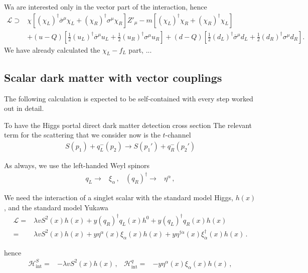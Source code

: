 Wa are interested only in the vector part of the interaction, hence
\begin{align}
   \mathcal{L}\supset& \chi \left[ \left( \chi_L \right)^{\dagger}  \overline{\sigma}^{\mu}\chi_L+\left( \chi_R \right)^{\dagger} {\sigma}^{\mu}  \chi_R \right]  Z'_{\mu}
           -m \left[\left( \chi_L \right)^{\dagger} \chi_R+
  \left( \chi_R \right)^{\dagger} \chi_L\right] \nonumber\\
  &+(u-Q)\left[ \frac{1}{2}\left( u_L \right)^{\dagger}\overline{\sigma}^{\mu} u_L+\frac{1}{2}\left( u_R \right)^{\dagger}{\sigma}^{\mu} u_R  \right]
  +(d-Q)\left[ \frac{1}{2}\left( d_L \right)^{\dagger}\overline{\sigma}^{\mu} d_L+\frac{1}{2}\left( d_R \right)^{\dagger}{\sigma}^{\mu} d_R  \right].
\end{align}
We have already calculated the $\chi_{L}-f_L$ part, ...
 
\subsection{Scalar dark matter with vector couplings}

The following calculation is expected to be self-contained with every step worked out in detail.

To have the Higgs portal direct dark matter detection cross section
The relevant term for the scattering that we consider now is the $t$-channel
\begin{align}
  S(p_1)+q_L^{-}(p_2)\to  S(p_1')+q_R^{-}(p_2')
\end{align}

As always, we use the left-handed Weyl spinors
\begin{align}
  q_L\to &\xi_{\alpha}\,, &   \left( q_R \right)^{\dagger}\to &\eta^{\alpha}\,,
\end{align}


We need the interaction of a singlet scalar with the standard model Higgs, $h(x)$, and the standard model Yukawa
\begin{align}
  \mathcal{L}=&\lambda v S^2(x) h(x)+y \left(q_R\right)^{\dagger} q_L(x) h^0 +y \left(q_L\right)^{\dagger} q_R(x) h(x) \nonumber\\
  =&\lambda v S^2(x) h(x)+y \eta^{\alpha} (x)\xi_{\alpha}(x)h(x) + y \eta^{\dagger\dot{\alpha}}(x) \xi_{\dot{\alpha}}^{\dagger}(x)h(x)\,. 
\end{align}

hence
\begin{align}
  \mathcal{H}_{\text{int}}^{S}=&-\lambda v S^2(x) h(x)\,, &
   \mathcal{H}_{\text{int}}^{q}=&-y \eta^{\alpha} (x)\xi_{\alpha}(x)h(x)\,,
\end{align}

